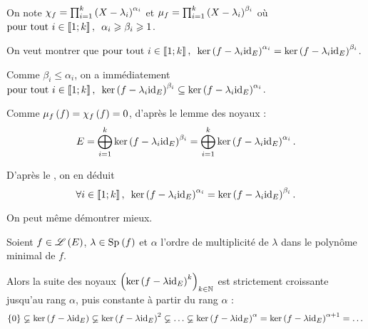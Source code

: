 \begin{dem}~\\
On note \(\chi_f=\prod_{i=1}^k\left(X-\lambda_i\right)^{\alpha_i}\) et \(\mu_f=\prod_{i=1}^k\left(X-\lambda_i\right)^{\beta_i}\) où \(\quantifs{\tpt i\in\interventierii{1}{k}}\alpha_i\geq\beta_i\geq1\).

On veut montrer que \(\quantifs{\tpt i\in\interventierii{1}{k}}\ker\paren{f-\lambda_i\id{E}}^{\alpha_i}=\ker\paren{f-\lambda_i\id{E}}^{\beta_i}\).

Comme \(\beta_i\leq\alpha_i\), on a immédiatement \(\quantifs{\tpt i\in\interventierii{1}{k}}\ker\paren{f-\lambda_i\id{E}}^{\beta_i}\subset\ker\paren{f-\lambda_i\id{E}}^{\alpha_i}\).

Comme \(\mu_f\left(f\right)=\chi_f\left(f\right)=0\), d'après le lemme des noyaux : \[E=\bigoplus_{i=1}^k\ker\left(f-\lambda_i\mathrm{id}_{E}\right)^{\beta_i}=\bigoplus_{i=1}^k\ker\left(f-\lambda_i\mathrm{id}_{E}\right)^{\alpha_i}.\]

D'après le , on en déduit \[\quantifs{\forall i\in\interventierii{1}{k}}\ker\paren{f-\lambda_i\id{E}}^{\alpha_i}=\ker\paren{f-\lambda_i\id{E}}^{\beta_i}.\]
\end{dem}

On peut même démontrer mieux.

\begin{prop}
Soient \(f\in\mathscr{L}\left(E\right)\), \(\lambda\in\Sp{f}\) et \(\alpha\) l'ordre de multiplicité de \(\lambda\) dans le polynôme minimal de \(f\).

Alors la suite des noyaux \(\left(\ker\left(f-\lambda\mathrm{id}_{E}\right)^k\right)_{k\in\mathbb{N}}\) est strictement croissante jusqu'au rang \(\alpha\), puis constante à partir du rang \(\alpha\) : \[\accol{0}\subsetneq\ker\paren{f-\lambda\id{E}}\subsetneq\ker\paren{f-\lambda\id{E}}^2\subsetneq\dots\subsetneq\ker\paren{f-\lambda\id{E}}^\alpha=\ker\paren{f-\lambda\id{E}}^{\alpha+1}=\dots\]
\end{prop}
